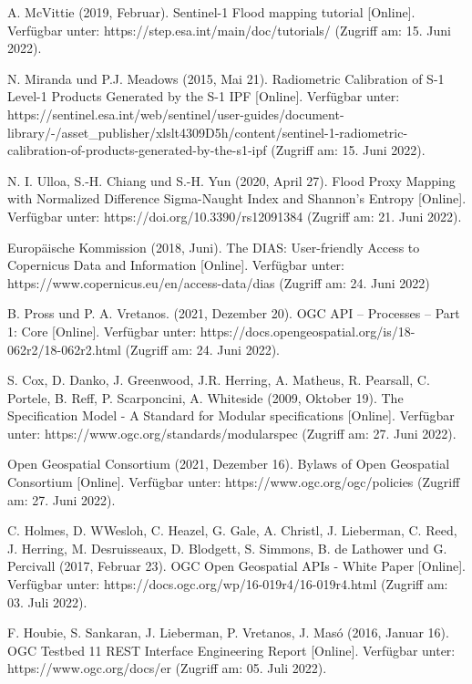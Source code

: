 \begin{thebibliography}{1}
A. McVittie (2019, Februar). Sentinel-1 Flood mapping tutorial [Online]. Verfügbar unter: 
https://step.esa.int/main/doc/tutorials/
(Zugriff am: 15. Juni 2022).

N. Miranda und P.J. Meadows (2015, Mai 21). Radiometric Calibration of S-1 Level-1 Products Generated by the S-1 IPF [Online]. Verfügbar unter: 
https://sentinel.esa.int/web/sentinel/user-guides/document-library/-/asset\_publisher/xlslt4309D5h/content/sentinel-1-radiometric-calibration-of-products-generated-by-the-s1-ipf
(Zugriff am: 15. Juni 2022).

N. I. Ulloa, S.-H. Chiang und S.-H. Yun (2020, April 27). Flood Proxy Mapping with Normalized Difference Sigma-Naught Index and Shannon’s Entropy [Online]. Verfügbar unter: 
https://doi.org/10.3390/rs12091384 
(Zugriff am: 21. Juni 2022).

Europäische Kommission (2018, Juni). The DIAS: User-friendly Access to Copernicus Data and Information [Online]. Verfügbar unter:
https://www.copernicus.eu/en/access-data/dias
(Zugriff am: 24. Juni 2022)

B. Pross und P. A. Vretanos. (2021, Dezember 20). OGC API – Processes – Part 1: Core [Online]. Verfügbar unter: 
https://docs.opengeospatial.org/is/18-062r2/18-062r2.html 
(Zugriff am: 24. Juni 2022).

S. Cox, D. Danko, J. Greenwood, J.R. Herring, A. Matheus, R. Pearsall, C. Portele, B. Reff, P. Scarponcini, A. Whiteside (2009, Oktober 19). The Specification Model - A Standard for Modular specifications [Online]. Verfügbar unter: 
https://www.ogc.org/standards/modularspec 
(Zugriff am: 27. Juni 2022).

Open Geospatial Consortium (2021, Dezember 16). Bylaws of Open Geospatial Consortium [Online]. Verfügbar unter: 
https://www.ogc.org/ogc/policies
(Zugriff am: 27. Juni 2022).

C. Holmes, D. WWesloh, C. Heazel, G. Gale, A. Christl, J. Lieberman, C. Reed, J. Herring, M. Desruisseaux, D. Blodgett, S. Simmons, B. de Lathower und G. Percivall (2017, Februar 23). OGC Open Geospatial APIs - White Paper [Online]. Verfügbar unter: 
https://docs.ogc.org/wp/16-019r4/16-019r4.html
(Zugriff am: 03. Juli 2022).

F. Houbie, S. Sankaran, J. Lieberman, P. Vretanos, J. Masó (2016, Januar 16). OGC Testbed 11 REST Interface Engineering Report [Online]. Verfügbar unter: 
https://www.ogc.org/docs/er
(Zugriff am: 05. Juli 2022).


\end{thebibliography}

